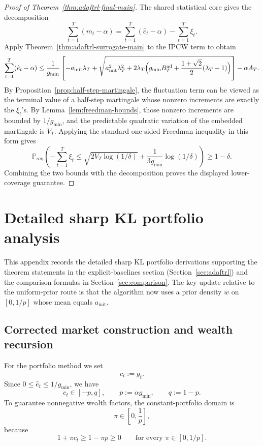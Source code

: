 \documentclass[11pt]{article}
\newcommand{\Prob}{\mathbb{P}}
\newcommand{\1}{\mathbf{1}}
\newcommand{\seq}{\mathrm{seq}}
\begin{document}
\begin{proof}[Proof of Theorem~\ref{thm:adaftrl-final-main}]
The shared statistical core gives the decomposition
\[
\sum_{t=1}^T (m_t-\alpha)
=
\sum_{t=1}^T (\hat e_t-\alpha) - \sum_{t=1}^T \xi_t.
\]
Apply Theorem~\ref{thm:adaftrl-surrogate-main} to the IPCW term to obtain
\[
\sum_{t=1}^T (\hat e_t-\alpha)
\le
\frac{1}{g_{\min}}
\left[
-a_{\mathrm{init}}\lambda_T
+
\sqrt{
a_{\mathrm{init}}^2\lambda_T^2
+
2\lambda_T\Bigl(g_{\min}B_T^{\mathrm{ad}}+\frac{1+\sqrt{2}}{2}(\lambda_T-1)\Bigr)
}
\right]
-
\alpha A_T.
\]
By Proposition~\ref{prop:half-step-martingale}, the fluctuation term can be viewed as the terminal value of a half-step martingale whose nonzero increments are exactly the \(\xi_t\)'s. By Lemma~\ref{lem:freedman-bounds}, those nonzero increments are bounded by \(1/g_{\min}\), and the predictable quadratic variation of the embedded martingale is \(V_T\). Applying the standard one-sided Freedman inequality in this form gives
\[
\Prob_{\seq}\!\left(
-\sum_{t=1}^T\xi_t
\le
\sqrt{2V_T\log(1/\delta)}
+
\frac{1}{3g_{\min}}\log(1/\delta)
\right)\ge 1-\delta.
\]
Combining the two bounds with the decomposition proves the displayed lower-coverage guarantee.
\end{proof}

\section{Detailed sharp KL portfolio analysis}
\label{app:kl-details}

This appendix records the detailed sharp KL portfolio derivations supporting the theorem statements in the explicit-baselines section (Section~\ref{sec:adaftrl}) and the comparison formulas in Section~\ref{sec:comparison}. The key update relative to the uniform-prior route is that the algorithm now uses a prior density \(w\) on \([0,1/p]\) whose mean equals \(a_{\mathrm{init}}\).

\subsection{Corrected market construction and wealth recursion}

For the portfolio method we set
\[
c_t:=\bar g_t.
\]
Since \(0\le \hat e_t\le 1/g_{\min}\), we have
\[
c_t\in[-p,q],
\qquad
p:=\alpha g_{\min},
\qquad
q:=1-p.
\]
To guarantee nonnegative wealth factors, the constant-portfolio domain is
\[
\pi\in\left[0,\frac{1}{p}\right],
\]
because
\[
1+\pi c_t\ge 1-\pi p\ge 0
\qquad\text{for every }\pi\in[0,1/p].
\]
\end{document}
